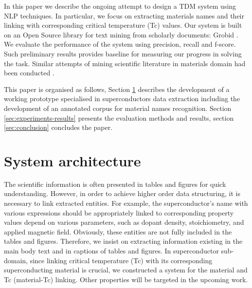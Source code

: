 \documentclass{article}[a4]
\begin{document}

In this paper we describe the ongoing attempt to design a TDM system using NLP techniques. In particular, we focus on extracting materials names and their linking with corresponding critical temperature (Tc) values.
Our system is built on an Open Source library for text mining from scholarly documents: Grobid \cite{GROBID}. We evaluate the performance of the system using precision, recall and f-score. Such preliminary results provides baseline for measuring our progress in solving the task.
Similar attempts of mining scientific literature in materials domain had been conducted \cite{nanocrystal_extraction} \cite{court2018auto}. 

This paper is organised as follows, Section \ref{sec:architecture} describes the development of a working prototype specialised in superconductors data extraction including the development of an annotated corpus for material names recognition. Section \ref{sec:experiments-results} presents the evaluation methods and results, section \ref{sec:conclusion} concludes the paper.

\section{System architecture}
\label{sec:architecture}
The scientific information is often presented in tables and figures for quick understanding. However, in order to achieve higher order data structuring, it is necessary to link extracted entities. For example, the superconductor’s name with various expressions should be appropriately linked to corresponding property values depend on various parameters, such as dopant density, stoichiometry, and applied magnetic field. Obviously, these entities are not fully included in the tables and figures. Therefore, we insist on extracting information existing in the main body text and in captions of tables and figures. In superconductor sub-domain, since linking critical temperature (Tc) with its corresponding superconducting material is crucial, we constructed a system for the material and Tc (material-Tc) linking. Other properties will be targeted in the upcoming work.
\end{document}
